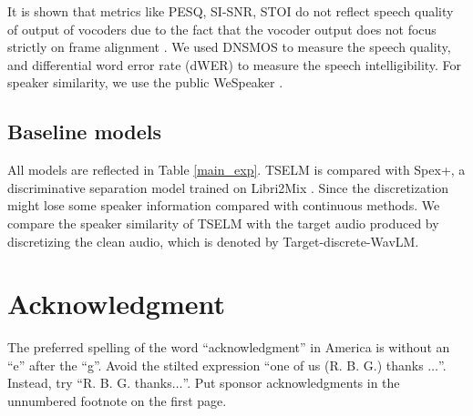 \documentclass[conference]{IEEEtran}
\begin{document}
It is shown that metrics like PESQ, SI-SNR, STOI do not reflect speech quality of output of 
vocoders due to the fact that the vocoder output does not focus strictly on frame alignment
\cite{tokensplit,selm}. We used DNSMOS \cite{dnsmos} to measure the speech quality, and differential 
word error 
rate (dWER) \cite{dwer} to measure the speech intelligibility. For speaker similarity, we use the 
public WeSpeaker \cite{wespeaker}.


\subsection{Baseline models}
All models are reflected in Table \ref{main_exp}. 
TSELM is compared with Spex+, a discriminative separation model \cite{spex_plus} trained on Libri2Mix \cite{librimix}. Since the discretization might lose some 
speaker information compared with continuous methods. We compare the speaker 
similarity of TSELM with the target audio produced by discretizing the clean audio, which is denoted by Target-discrete-WavLM. 



\section*{Acknowledgment}

The preferred spelling of the word ``acknowledgment'' in America is without 
an ``e'' after the ``g''. Avoid the stilted expression ``one of us (R. B. 
G.) thanks $\ldots$''. Instead, try ``R. B. G. thanks$\ldots$''. Put sponsor 
acknowledgments in the unnumbered footnote on the first page.



\end{document}

